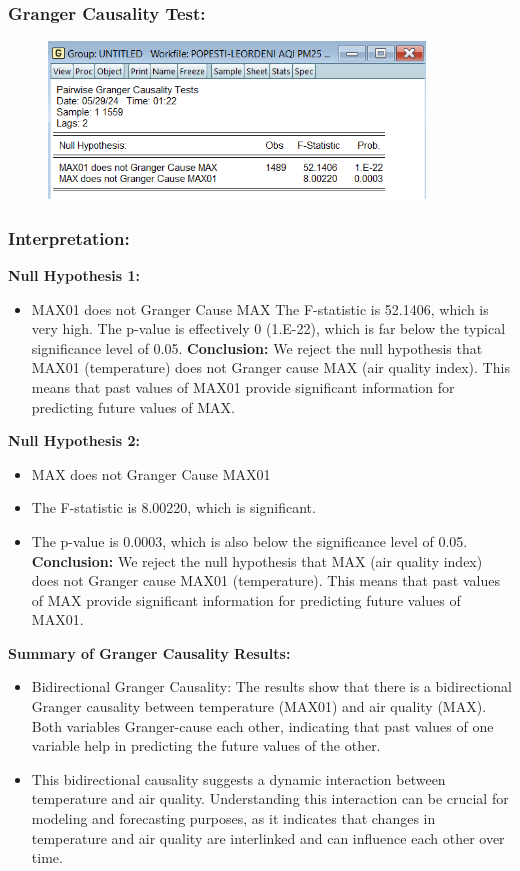 \documentclass{article} %
\begin{document}
\subsubsection*{Granger Causality Test:}

\begin{figure}[H]
    \centering
    \includegraphics[width=10cm]{images/image13.png}
\end{figure}

\subsubsection*{Interpretation:}
\textbf{Null Hypothesis 1:}
\begin{itemize}
    \item MAX01 does not Granger Cause MAX
    The F-statistic is 52.1406, which is very high.
    The p-value is effectively 0 (1.E-22), which is far below the typical significance level of 0.05.
    \textbf{Conclusion:} We reject the null hypothesis that MAX01 (temperature) does not Granger cause MAX (air quality index). This means that past values of MAX01 provide significant information for predicting future values of MAX.    
\end{itemize}

\textbf{Null Hypothesis 2:}
\begin{itemize}
    \item MAX does not Granger Cause MAX01
    \item The F-statistic is 8.00220, which is significant.
    \item The p-value is 0.0003, which is also below the significance level of 0.05.
    \textbf{Conclusion:} We reject the null hypothesis that MAX (air quality index) does not Granger cause MAX01 (temperature). This means that past values of MAX provide significant information for predicting future values of MAX01.
\end{itemize}

\textbf{Summary of Granger Causality Results:}
\begin{itemize}
    \item Bidirectional Granger Causality: The results show that there is a bidirectional Granger causality between temperature (MAX01) and air quality (MAX). Both variables Granger-cause each other, indicating that past values of one variable help in predicting the future values of the other.
    \item This bidirectional causality suggests a dynamic interaction between temperature and air quality. Understanding this interaction can be crucial for modeling and forecasting purposes, as it indicates that changes in temperature and air quality are interlinked and can influence each other over time.
\end{itemize}
\end{document}
